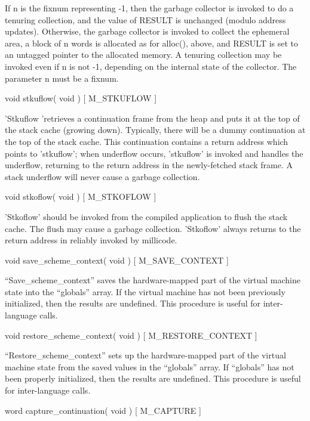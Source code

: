 \begin{description}
If n is the fixnum representing -1, then the garbage collector is
invoked to do a tenuring collection, and the value of RESULT is
unchanged (modulo address updates). Otherwise, the garbage collector
is invoked to collect the ephemeral area, a block of n words is
allocated as for alloc(), above, and RESULT is set to an untagged
pointer to the allocated memory. A tenuring collection may be invoked
even if n is not -1, depending on the internal state of the collector.
The parameter n must be a fixnum.

\item {void stkuflow( void ) \hfill [ M\_STKUFLOW ]}

'Stkuflow 'retrieves a continuation frame from the heap and puts it at
the top of the stack cache (growing down). Typically, there will be a
dummy continuation at the top of the stack cache. This continuation
contains a return address which points to 'stkuflow'; when underflow
occurs, 'stkuflow' is invoked and handles the underflow, returning to
the return address in the newly-fetched stack frame. A stack underflow
will never cause a garbage collection.

\item {void stkoflow( void ) \hfill [ M\_STKOFLOW ] }

'Stkoflow' should be invoked from the compiled application to flush the
stack cache. The flush may cause a garbage collection. 
'Stkoflow' always returns to the return address in %
reliably invoked by millicode.

\item {void save\_scheme\_context( void ) \hfill [ M\_SAVE\_CONTEXT ] }

``Save\_scheme\_context'' saves the hardware-mapped part of the virtual machine
state into the ``globals'' array. If the virtual machine has not been
previously initialized, then the results are undefined. This procedure
is useful for inter-language calls.

\item {void restore\_scheme\_context( void ) \hfill [ M\_RESTORE\_CONTEXT ]}

``Restore\_scheme\_context'' sets up the hardware-mapped part of the virtual
machine state from the saved values in the ``globals'' array. If ``globals''
has not been properly initialized, then the results are undefined. This
procedure is useful for inter-language calls.

\item { word capture\_continuation( void ) \hfill [ M\_CAPTURE ]}


\end{description}
